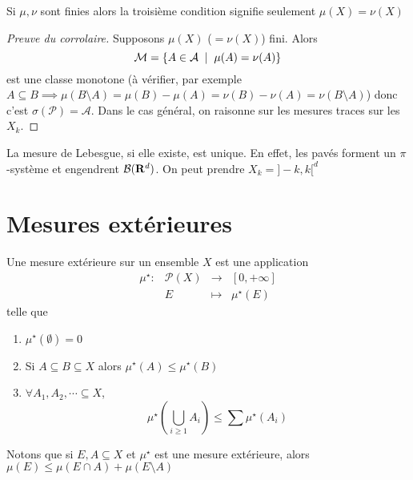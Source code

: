 \begin{rem}
    Si $\mu, \nu$ sont finies alors la troisième condition signifie seulement  $\mu(X)=\nu(X)$
\end{rem}

\begin{proof}[Preuve du corrolaire]
    Supposons $\mu(X)$ ($=\nu(X)$) fini. Alors \[
        \mathcal  M= \left\{ A \in  \mathcal  A \;\suchthat\; \mu(A)=\nu(A) \right\} 
    \] 
    est une classe monotone (à vérifier, par exemple $A\subseteq B\implies \mu(B \setminus  A)=\mu(B)-\mu(A)=\nu(B)-\nu(A)=\nu(B \setminus  A)$) donc c'est $\sigma(\mathcal P)=\mathcal  A$. Dans le cas général, on raisonne sur les mesures traces sur les $X_k$.
\end{proof}

\begin{ex}
    La mesure de Lebesgue, si elle existe, est unique. En effet, les pavés forment un $\pi$-système et engendrent  $\mathcal  B(\mathbf R^d)$. On peut prendre $X_k=]-k,k[^d$
\end{ex}

\section{Mesures extérieures}

\begin{dfn}
    Une mesure extérieure sur un ensemble $X$ est une application  \[
    \begin{array}{rrcl}
        \mu^\star:& \mathcal  P(X) & \longrightarrow &[0, +\infty]  \\
         & E & \longmapsto & \displaystyle \mu^\star(E)
    \end{array}
    \]
    telle que \begin{enumerate}
        \item $\mu^\star(\emptyset)=0$
        \item Si  $A\subseteq B\subseteq X$ alors $\mu^\star(A) \leq \mu^\star (B)$
        \item $\forall  A_1, A_2, \cdots \subseteq X$, \[
                \mu^\star \left(\bigcup_{i\geq 1}A_i\right) \leq \sum \mu^\star(A_i)
        \]
    \end{enumerate}
\end{dfn}

\begin{rem}
    Notons que si $E, A\subseteq X$ et $\mu^\star$ est une mesure extérieure, alors  $\mu(E)\leq \mu(E\cap A)+\mu(E \setminus  A)$
\end{rem}

